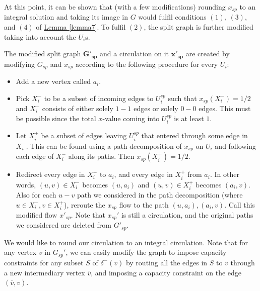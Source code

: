 \documentclass[./main.tex]{subfiles}
\begin{document}
		At this point, it can be shown that (with a few modifications) rounding $x_{sp}$ to an integral solution and taking its image in $G$ would fulfil conditions $(1)$, $(3)$, and $(4)$ of \hyperref[lemma7]{Lemma \ref{lemma7}}. To fulfil $(2)$, the split graph is further modified taking into account the $U_i$s.\\
		\vspace{2mm}

		\begin{definition}\label{def:6.1}
			The modified split graph $\bm{G'_{sp}}$ and a circulation on it $\bm{x'_{sp}}$ are created by modifying $G_{sp}$ and $x_{sp}$ according to the following procedure for every $U_i$:
			\begin{itemize}[-]
				\item Add a new vertex called $a_i$.

				\item Pick $X_i^-$ to be a subset of incoming edges to $U_i^{sp}$ such that $x_{sp}(X_i^-) = 1/2$ and $X_i^-$ consists of either solely $1-1$ edges or solely $0-0$ edges. This must be possible since the total $x$-value coming into $U_i^{sp}$ is at least $1$.

				\item Let $X_i^+$ be a subset of edges leaving $U_i^{sp}$ that entered through some edge in $X_i^-$. This can be found using a path decomposition of $x_{sp}$ on $U_i$ and following each edge of $X_i^-$ along its paths. Then $x_{sp}(X_i^+) = 1/2$.

				\item Redirect every edge in $X_i^-$ to $a_i$, and every edge in $X_i^+$ from $a_i$. In other words, $(u,v)\in X_i^-$ becomes $(u,a_i)$ and $(u,v)\in X_i^+$ becomes $(a_i, v)$. Also for each $u-v$ path we considered in the path decomposition (where $u\in X_i^-, v\in X_i^+$), reroute the $x_{sp}$ flow to the path $(u,a_i),(a_i,v)$. Call this modified flow $x'_{sp}$. Note that $x_{sp}'$ is still a circulation, and the original paths we considered are deleted from $G'_{sp}$.\\
			\end{itemize}
		\end{definition}
		We would like to round our circulation to an integral circulation.
		Note that for any vertex $v$ in $G_{sp}'$, we can easily modify the graph to impose capacity constraints for any subset $S$ of $\delta^-(v)$ by routing all the edges in $S$ to $v$ through a new intermediary vertex $\overline{v}$, and imposing a capacity constraint on the edge $(\overline{v},v)$.
\end{document}
